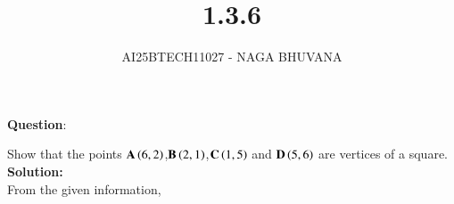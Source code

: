 \documentclass[journal,12pt,onecolumn]{IEEEtran}
\begin{document}
\title{1.3.6}
\author{AI25BTECH11027 - NAGA BHUVANA}
{\let\newpage\relax\maketitle}

		\textbf{Question}:

		\noindent Show that the points $\textbf{A}\left(6,2\right)$,$\textbf{B}\left(2,1\right)$,$\textbf{C}\left(1,5\right)$ and $\textbf{D}\left(5,6\right)$ are vertices of a square.\\
		\textbf{Solution:}\\
        From the given information,
\end{document}
